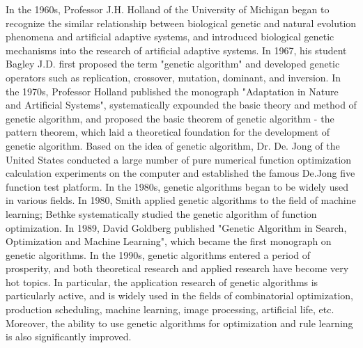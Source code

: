 \documentclass[12pt]{article}
\begin{document}
In the 1960s, Professor J.H. Holland of the University of Michigan began to recognize the similar relationship between biological genetic and natural evolution phenomena and artificial adaptive systems, and introduced biological genetic mechanisms into the research of artificial adaptive systems. In 1967, his student Bagley J.D. first proposed the term "genetic algorithm" and developed genetic operators such as replication, crossover, mutation, dominant, and inversion. In the 1970s, Professor Holland published the monograph "Adaptation in Nature and Artificial Systems", systematically expounded the basic theory and method of genetic algorithm, and proposed the basic theorem of genetic algorithm - the pattern theorem, which laid a theoretical foundation for the development of genetic algorithm. Based on the idea of ​​genetic algorithm, Dr. De. Jong of the United States conducted a large number of pure numerical function optimization calculation experiments on the computer and established the famous De.Jong five function test platform. In the 1980s, genetic algorithms began to be widely used in various fields. In 1980, Smith applied genetic algorithms to the field of machine learning; Bethke systematically studied the genetic algorithm of function optimization. In 1989, David Goldberg published "Genetic Algorithm in Search, Optimization and Machine Learning", which became the first monograph on genetic algorithms. In the 1990s, genetic algorithms entered a period of prosperity, and both theoretical research and applied research have become very hot topics. In particular, the application research of genetic algorithms is particularly active, and is widely used in the fields of combinatorial optimization, production scheduling, machine learning, image processing, artificial life, etc. Moreover, the ability to use genetic algorithms for optimization and rule learning is also significantly improved.
\end{document}
